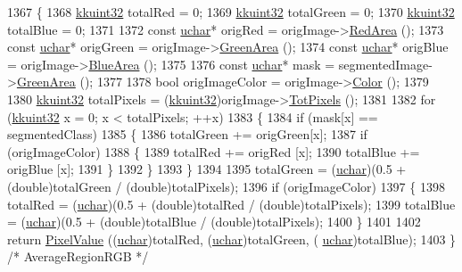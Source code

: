\begin{DoxyCode}
1367 \{
1368   \hyperlink{namespace_k_k_b_af8d832f05c54994a1cce25bd5743e19a}{kkuint32}  totalRed   = 0;
1369   \hyperlink{namespace_k_k_b_af8d832f05c54994a1cce25bd5743e19a}{kkuint32}  totalGreen = 0;
1370   \hyperlink{namespace_k_k_b_af8d832f05c54994a1cce25bd5743e19a}{kkuint32}  totalBlue  = 0;
1371 
1372   \textcolor{keyword}{const} \hyperlink{namespace_k_k_b_ace9969169bf514f9ee6185186949cdf7}{uchar}*  origRed   = origImage->\hyperlink{class_k_k_b_1_1_raster_aa3d0f9b4ce0fdd8ac97f996058d09b22}{RedArea}   ();
1373   \textcolor{keyword}{const} \hyperlink{namespace_k_k_b_ace9969169bf514f9ee6185186949cdf7}{uchar}*  origGreen = origImage->\hyperlink{class_k_k_b_1_1_raster_af6ceacfa7835a295d239d141627dbec7}{GreenArea} ();
1374   \textcolor{keyword}{const} \hyperlink{namespace_k_k_b_ace9969169bf514f9ee6185186949cdf7}{uchar}*  origBlue  = origImage->\hyperlink{class_k_k_b_1_1_raster_ade7c77867e6b3833e96f5f86aefcffec}{BlueArea}  ();
1375 
1376   \textcolor{keyword}{const} \hyperlink{namespace_k_k_b_ace9969169bf514f9ee6185186949cdf7}{uchar}*  mask = segmentedImage->\hyperlink{class_k_k_b_1_1_raster_af6ceacfa7835a295d239d141627dbec7}{GreenArea} ();
1377 
1378   \textcolor{keywordtype}{bool}  origImageColor = origImage->\hyperlink{class_k_k_b_1_1_raster_a644248f99009d64ac4b8fef4a22aff25}{Color} ();
1379 
1380   \hyperlink{namespace_k_k_b_af8d832f05c54994a1cce25bd5743e19a}{kkuint32}  totalPixels = (\hyperlink{namespace_k_k_b_af8d832f05c54994a1cce25bd5743e19a}{kkuint32})origImage->\hyperlink{class_k_k_b_1_1_raster_a174a392b71afc2295a0ccbfca3d984e9}{TotPixels} ();
1381 
1382   \textcolor{keywordflow}{for}  (\hyperlink{namespace_k_k_b_af8d832f05c54994a1cce25bd5743e19a}{kkuint32} x = 0;  x < totalPixels;  ++x)
1383   \{
1384     \textcolor{keywordflow}{if}  (mask[x] == segmentedClass)
1385     \{
1386       totalGreen += origGreen[x];
1387       \textcolor{keywordflow}{if}  (origImageColor)
1388       \{
1389         totalRed   += origRed  [x];
1390         totalBlue  += origBlue [x];
1391       \}
1392     \}
1393   \}
1394 
1395   totalGreen = (\hyperlink{namespace_k_k_b_ace9969169bf514f9ee6185186949cdf7}{uchar})(0.5 + (\textcolor{keywordtype}{double})totalGreen / (double)totalPixels);
1396   \textcolor{keywordflow}{if}  (origImageColor)
1397   \{
1398     totalRed  = (\hyperlink{namespace_k_k_b_ace9969169bf514f9ee6185186949cdf7}{uchar})(0.5 + (\textcolor{keywordtype}{double})totalRed  / (double)totalPixels);
1399     totalBlue = (\hyperlink{namespace_k_k_b_ace9969169bf514f9ee6185186949cdf7}{uchar})(0.5 + (\textcolor{keywordtype}{double})totalBlue / (double)totalPixels);
1400   \}
1401 
1402   \textcolor{keywordflow}{return}  \hyperlink{class_k_k_b_1_1_pixel_value}{PixelValue} ((\hyperlink{namespace_k_k_b_ace9969169bf514f9ee6185186949cdf7}{uchar})totalRed, (\hyperlink{namespace_k_k_b_ace9969169bf514f9ee6185186949cdf7}{uchar})totalGreen, (
      \hyperlink{namespace_k_k_b_ace9969169bf514f9ee6185186949cdf7}{uchar})totalBlue);
1403 \}  \textcolor{comment}{/* AverageRegionRGB */}
\end{DoxyCode}
